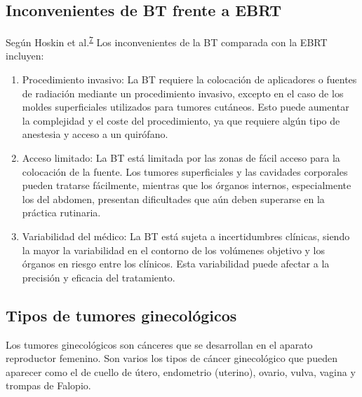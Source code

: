 \documentclass[
  a4paper,
]{scrreprt}
\begin{document}
\hypertarget{inconvenientes-de-bt-frente-a-ebrt}{%
\subsection{Inconvenientes de BT frente a
EBRT}\label{inconvenientes-de-bt-frente-a-ebrt}}

Según Hoskin et
al.\textsuperscript{\protect\hyperlink{ref-clinic2012}{7}} Los
inconvenientes de la BT comparada con la EBRT incluyen:

\begin{enumerate}
\def\labelenumi{\arabic{enumi}.}
\item
  Procedimiento invasivo: La BT requiere la colocación de aplicadores o
  fuentes de radiación mediante un procedimiento invasivo, excepto en el
  caso de los moldes superficiales utilizados para tumores cutáneos.
  Esto puede aumentar la complejidad y el coste del procedimiento, ya
  que requiere algún tipo de anestesia y acceso a un quirófano.
\item
  Acceso limitado: La BT está limitada por las zonas de fácil acceso
  para la colocación de la fuente. Los tumores superficiales y las
  cavidades corporales pueden tratarse fácilmente, mientras que los
  órganos internos, especialmente los del abdomen, presentan
  dificultades que aún deben superarse en la práctica rutinaria.
\item
  Variabilidad del médico: La BT está sujeta a incertidumbres clínicas,
  siendo la mayor la variabilidad en el contorno de los volúmenes
  objetivo y los órganos en riesgo entre los clínicos. Esta variabilidad
  puede afectar a la precisión y eficacia del tratamiento.
\end{enumerate}

\hypertarget{tipos-de-tumores-ginecoluxf3gicos}{%
\subsection{Tipos de tumores
ginecológicos}\label{tipos-de-tumores-ginecoluxf3gicos}}

Los tumores ginecológicos son cánceres que se desarrollan en el aparato
reproductor femenino. Son varios los tipos de cáncer ginecológico que
pueden aparecer como el de cuello de útero, endometrio (uterino),
ovario, vulva, vagina y trompas de Falopio.
\end{document}
